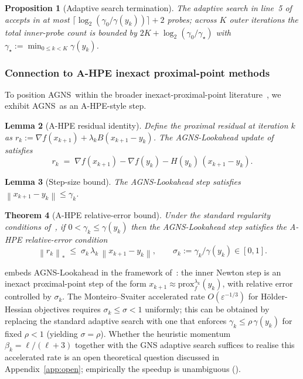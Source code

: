 \documentclass[conference]{IEEEtran}
\newtheorem{theorem}{Theorem}
\newtheorem{lemma}[theorem]{Lemma}
\newtheorem{proposition}[theorem]{Proposition}
\theoremstyle{remark}
\newcommand{\dnorm}[1]{\left\lVert#1\right\rVert_*}
\newcommand{\norm}[1]{\left\lVert#1\right\rVert}
\newcommand{\AGNS}{\textsc{AGNS}}
\begin{document}
\begin{proposition}[Adaptive search termination]
\label{prop:adaptive-search}
The adaptive search in line~5 of  accepts in at most
$\lceil \log_2(\gamma_0 / \gamma(y_k)) \rceil + 2$ probes; across $K$
outer iterations the total inner-probe count is bounded by
$2K + \log_2(\gamma_0 / \gamma_\star)$ with $\gamma_\star := \min_{0 \le k < K} \gamma(y_k)$.
\end{proposition}

\subsubsection*{Connection to A-HPE inexact proximal-point methods}

To position \AGNS\ within the broader inexact-proximal-point
literature~\cite{monteiro2013accelerated, solodov1999hybrid}, we
exhibit \AGNS\ as an A-HPE-style step.

\begin{lemma}[A-HPE residual identity]
\label{lem:ahpe-residual}
Define the proximal residual at iteration $k$ as
$r_k := \nabla f(x_{k+1}) + \lambda_k B(x_{k+1} - y_k)$.
The AGNS-Lookahead update of  satisfies
\begin{equation}
\label{eq:ahpe-residual}
r_k \;=\; \nabla f(x_{k+1}) - \nabla f(y_k) - H(y_k)\,(x_{k+1} - y_k).
\end{equation}
\end{lemma}

\begin{lemma}[Step-size bound]
\label{lem:step-size}
The AGNS-Lookahead step satisfies $\norm{x_{k+1} - y_k} \le \gamma_k$.
\end{lemma}

\begin{theorem}[A-HPE relative-error bound]
\label{thm:ahpe}
Under the standard regularity conditions
of~\cite[Lemma~1]{semenov2025gradient}, if $0 < \gamma_k \le \gamma(y_k)$
then the AGNS-Lookahead step satisfies the A-HPE relative-error
condition
\begin{equation}
\label{eq:ahpe-bound}
\dnorm{r_k} \;\le\; \sigma_k\,\lambda_k\,\norm{x_{k+1} - y_k},
\qquad \sigma_k := \gamma_k / \gamma(y_k) \in [0, 1].
\end{equation}
\end{theorem}

 embeds \AGNS-Lookahead in the framework
of~\cite{monteiro2013accelerated}: the inner Newton step is an inexact
proximal-point step of the form
$x_{k+1} \approx \mathrm{prox}_f^{\lambda_k}(y_k)$, with relative error
controlled by $\sigma_k$. The Monteiro--Svaiter accelerated rate
$O(\varepsilon^{-1/3})$ for H\"older-Hessian objectives requires
$\sigma_k \le \sigma < 1$ uniformly; this can be obtained by replacing
the standard adaptive search with one that enforces
$\gamma_k \le \rho\,\gamma(y_k)$ for fixed $\rho < 1$ (yielding
$\sigma = \rho$). Whether the heuristic momentum
$\beta_k = \ell/(\ell+3)$ together with the GNS adaptive search
suffices to realise this accelerated rate is an open theoretical
question discussed in Appendix~\ref{app:open}; empirically the speedup
is unambiguous ().
\end{document}
